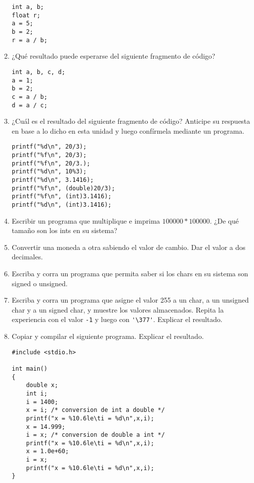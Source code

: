 \begin{enumerate}
	\begin{lstlisting}
int a, b;
float r;
a = 5;
b = 2;
r = a / b;		
	\end{lstlisting}
	\item ¿Qué resultado puede esperarse del siguiente fragmento de código?
	\begin{lstlisting}
int a, b, c, d;
a = 1;
b = 2;
c = a / b;
d = a / c;
	\end{lstlisting}
	\item ¿Cuál es el resultado del siguiente fragmento de código? Anticipe su respuesta en base a lo dicho en
esta unidad y luego confírmela mediante un programa.
	\begin{lstlisting}
printf("%d\n", 20/3);
printf("%f\n", 20/3);
printf("%f\n", 20/3.);
printf("%d\n", 10%3);
printf("%d\n", 3.1416);
printf("%f\n", (double)20/3);
printf("%f\n", (int)3.1416);
printf("%d\n", (int)3.1416);
	\end{lstlisting}
\item Escribir un programa que multiplique e imprima $100000 * 100000$. ¿De qué tamaño son los ints
en su sistema?
\item Convertir una moneda a otra sabiendo el valor de cambio. Dar el valor a dos decimales.
\item Escriba y corra un programa que permita saber si los chars en su sistema son signed o unsigned.
\item Escriba y corra un programa que asigne el valor 255 a un char, a un unsigned char y a un signed
char, y muestre los valores almacenados. Repita la experiencia con el valor \lstinline$-1$ y luego con \lstinline$'\377'$.
Explicar el resultado.
\item Copiar y compilar el siguiente programa. Explicar el resultado.
\begin{lstlisting}
#include <stdio.h>

int main() 
{
	double x;
	int i;
	i = 1400;
	x = i; /* conversion de int a double */
	printf("x = %10.6le\ti = %d\n",x,i);
	x = 14.999;
	i = x; /* conversion de double a int */
	printf("x = %10.6le\ti = %d\n",x,i);
	x = 1.0e+60;
	i = x;
	printf("x = %10.6le\ti = %d\n",x,i);
}
	\end{lstlisting}


\end{enumerate}
